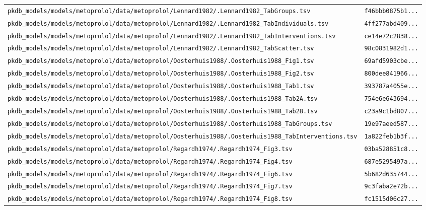 \begin{longtable}{ll}
\texttt{pkdb\_models/models/metoprolol/data/metoprolol/Lennard1982/.Lennard1982\_TabGroups.tsv} & \texttt{f46bbb0875b1...} \\
\texttt{pkdb\_models/models/metoprolol/data/metoprolol/Lennard1982/.Lennard1982\_TabIndividuals.tsv} & \texttt{4ff277abd409...} \\
\texttt{pkdb\_models/models/metoprolol/data/metoprolol/Lennard1982/.Lennard1982\_TabInterventions.tsv} & \texttt{ce14e72c2838...} \\
\texttt{pkdb\_models/models/metoprolol/data/metoprolol/Lennard1982/.Lennard1982\_TabScatter.tsv} & \texttt{98c0831982d1...} \\
\texttt{pkdb\_models/models/metoprolol/data/metoprolol/Oosterhuis1988/.Oosterhuis1988\_Fig1.tsv} & \texttt{69afd5903cbe...} \\
\texttt{pkdb\_models/models/metoprolol/data/metoprolol/Oosterhuis1988/.Oosterhuis1988\_Fig2.tsv} & \texttt{800dee841966...} \\
\texttt{pkdb\_models/models/metoprolol/data/metoprolol/Oosterhuis1988/.Oosterhuis1988\_Tab1.tsv} & \texttt{393787a4055e...} \\
\texttt{pkdb\_models/models/metoprolol/data/metoprolol/Oosterhuis1988/.Oosterhuis1988\_Tab2A.tsv} & \texttt{754e6e643694...} \\
\texttt{pkdb\_models/models/metoprolol/data/metoprolol/Oosterhuis1988/.Oosterhuis1988\_Tab2B.tsv} & \texttt{c23a9c1bd807...} \\
\texttt{pkdb\_models/models/metoprolol/data/metoprolol/Oosterhuis1988/.Oosterhuis1988\_TabGroups.tsv} & \texttt{19e97aeed587...} \\
\texttt{pkdb\_models/models/metoprolol/data/metoprolol/Oosterhuis1988/.Oosterhuis1988\_TabInterventions.tsv} & \texttt{1a822feb1b3f...} \\
\texttt{pkdb\_models/models/metoprolol/data/metoprolol/Regardh1974/.Regardh1974\_Fig3.tsv} & \texttt{03ba528851c8...} \\
\texttt{pkdb\_models/models/metoprolol/data/metoprolol/Regardh1974/.Regardh1974\_Fig4.tsv} & \texttt{687e5295497a...} \\
\texttt{pkdb\_models/models/metoprolol/data/metoprolol/Regardh1974/.Regardh1974\_Fig6.tsv} & \texttt{5b682d635744...} \\
\texttt{pkdb\_models/models/metoprolol/data/metoprolol/Regardh1974/.Regardh1974\_Fig7.tsv} & \texttt{9c3faba2e72b...} \\
\texttt{pkdb\_models/models/metoprolol/data/metoprolol/Regardh1974/.Regardh1974\_Fig8.tsv} & \texttt{fc1515d06c27...} \\

\end{longtable}
